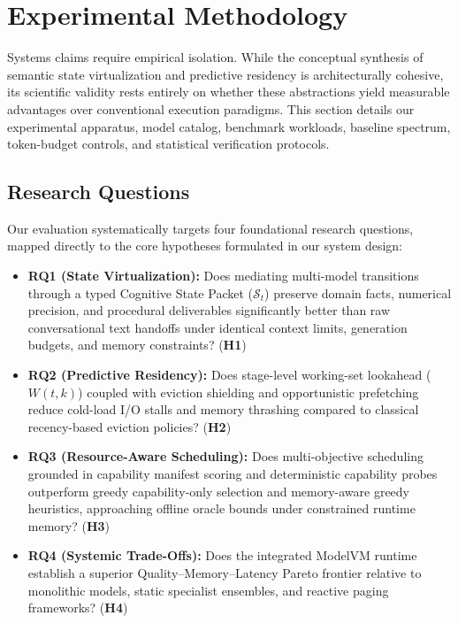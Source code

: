 \section{Experimental Methodology}
\label{sec:methodology}

Systems claims require empirical isolation. While the conceptual synthesis of semantic state virtualization and predictive residency is architecturally cohesive, its scientific validity rests entirely on whether these abstractions yield measurable advantages over conventional execution paradigms. This section details our experimental apparatus, model catalog, benchmark workloads, baseline spectrum, token-budget controls, and statistical verification protocols.

\subsection{Research Questions}
\label{sec:rqs}

Our evaluation systematically targets four foundational research questions, mapped directly to the core hypotheses formulated in our system design:

\begin{itemize}
    \item \textbf{RQ1 (State Virtualization):} Does mediating multi-model transitions through a typed Cognitive State Packet ($\mathcal{S}_t$) preserve domain facts, numerical precision, and procedural deliverables significantly better than raw conversational text handoffs under identical context limits, generation budgets, and memory constraints? (\textbf{H1})
    \item \textbf{RQ2 (Predictive Residency):} Does stage-level working-set lookahead ($W(t, k)$) coupled with eviction shielding and opportunistic prefetching reduce cold-load I/O stalls and memory thrashing compared to classical recency-based eviction policies? (\textbf{H2})
    \item \textbf{RQ3 (Resource-Aware Scheduling):} Does multi-objective scheduling grounded in capability manifest scoring and deterministic capability probes outperform greedy capability-only selection and memory-aware greedy heuristics, approaching offline oracle bounds under constrained runtime memory? (\textbf{H3})
    \item \textbf{RQ4 (Systemic Trade-Offs):} Does the integrated ModelVM runtime establish a superior Quality--Memory--Latency Pareto frontier relative to monolithic models, static specialist ensembles, and reactive paging frameworks? (\textbf{H4})
\end{itemize}

